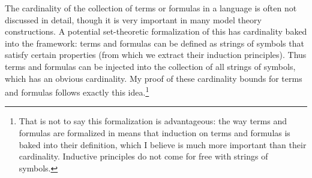 The cardinality of the collection of terms or formulas in a language
is often not discussed in detail,
though it is very important in many model theory constructions.
A potential set-theoretic formalization of this has cardinality baked into the framework:
terms and formulas can be defined as strings of symbols that satisfy certain properties
(from which we extract their induction principles).
Thus terms and formulas can be injected into the collection of
all strings of symbols, which has an obvious cardinality.
My proof of these cardinality bounds for terms and formulas
follows exactly this idea.\footnote{
  That is not to say this formalization is advantageous:
  the way terms and formulas are formalized in 
  means that induction on terms and formulas is baked into their definition,
  which I believe is much more important than their cardinality.
  Inductive principles do not come for free with strings of symbols.}


